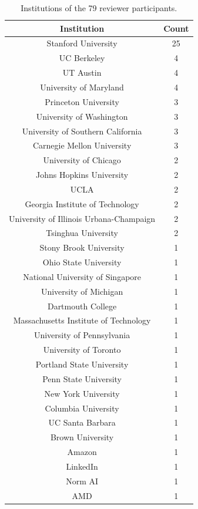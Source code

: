 \begin{table}[ht]
\centering
\begin{tabular}{c|c}
 \hline
 \textbf{Institution} & \textbf{Count} \\
 \hline
 Stanford University & 25 \\
 UC Berkeley & 4 \\
 UT Austin & 4 \\
 University of Maryland & 4 \\
 Princeton University & 3 \\
 University of Washington & 3 \\
 University of Southern California & 3 \\
 Carnegie Mellon University & 3 \\
 University of Chicago & 2 \\
 Johns Hopkins University & 2 \\
 UCLA & 2 \\
 Georgia Institute of Technology & 2 \\
 University of Illinois Urbana-Champaign & 2 \\
 Tsinghua University & 2 \\
 Stony Brook University & 1 \\
 Ohio State University & 1 \\
 National University of Singapore & 1 \\
 University of Michigan & 1 \\
 Dartmouth College & 1 \\
 Massachusetts Institute of Technology & 1 \\
 University of Pennsylvania & 1 \\
 University of Toronto & 1 \\
 Portland State University & 1 \\
 Penn State University & 1 \\
 New York University & 1 \\
 Columbia University & 1 \\
 UC Santa Barbara & 1 \\
 Brown University & 1 \\
 Amazon & 1 \\
 LinkedIn & 1 \\
 Norm AI & 1 \\
 AMD & 1 \\
 \hline
\end{tabular}
\caption{Institutions of the 79 reviewer participants.}
\label{table:reviewer_institution}
\end{table}



